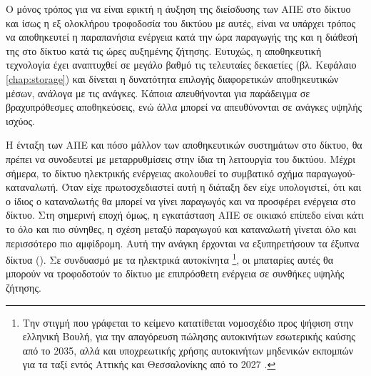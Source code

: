 \documentclass[12pt]{report}
\begin{document}
Ο μόνος τρόπος για να είναι εφικτή η άυξηση της διείσδυσης των ΑΠΕ στο δίκτυο και ίσως η εξ ολοκλήρου τροφοδοσία του δικτύου με αυτές, είναι να υπάρχει τρόπος να αποθηκευτεί η παραπανήσια ενέργεια κατά την ώρα παραγωγής της
και η διάθεσή της στο δίκτυο κατά τις ώρες αυξημένης ζήτησης. Ευτυχώς, η αποθηκευτική τεχνολογία έχει αναπτυχθεί σε μεγάλο βαθμό τις τελευταίες δεκαετίες (βλ. Κεφάλαιο \ref{chap:storage}) και δίνεται η δυνατότητα επιλογής
διαφορετικών αποθηκευτικών μέσων, ανάλογα με τις ανάγκες. Κάποια απευθήνονται για παράδειγμα σε βραχυπρόθεσμες αποθηκεύσεις, ενώ άλλα μπορεί να απευθύνονται σε ανάγκες υψηλής ισχύος. 

Η ένταξη των ΑΠΕ και πόσο μάλλον των αποθηκευτικών συστημάτων στο δίκτυο, θα πρέπει να συνοδευτεί με μεταρρυθμίσεις στην ίδια τη λειτουργία του δικτύου. Μέχρι σήμερα, το δίκτυο ηλεκτρικής ενέργειας ακολουθεί 
το συμβατικό σχήμα παραγωγού-καταναλωτή. Όταν είχε πρωτοσχεδιαστεί αυτή η διάταξη δεν είχε υπολογιστεί, ότι και ο ίδιος ο καταναλωτής θα μπορεί να γίνει παραγωγός και να προσφέρει ενέργεια στο δίκτυο.
Στη σημερινή εποχή όμως, η εγκατάσταση ΑΠΕ σε οικιακό επίπεδο είναι κάτι το όλο και πιο σύνηθες, η σχέση μεταξύ παραγωγού και καταναλωτή γίνεται όλο και περισσότερο πιο αμφίδρομη.
Αυτή την ανάγκη έρχονται να εξυπηρετήσουν τα έξυπνα δίκτυα ({}). Σε συνδυασμό με τα ηλεκτρικά αυτοκίνητα \footnote{Την στιγμή που γράφεται το κείμενο κατατίθεται νομοσχέδιο προς ψήφιση στην ελληνική Βουλή,
για την απαγόρευση πώλησης αυτοκινήτων εσωτερικής καύσης από το 2035, αλλά και υποχρεωτικής χρήσης αυτοκινήτων μηδενικών εκπομπών για τα ταξί εντός Αττικής και Θεσσαλονίκης από το 2027 \parencite{energypress1105}.}, 
οι μπαταρίες αυτές θα μπορούν να τροφοδοτούν το δίκτυο με επιπρόσθετη ενέργεια σε συνθήκες υψηλής ζήτησης.
\end{document}
